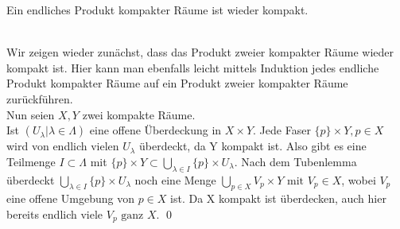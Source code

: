 \begin{Satz}\label{satz:prodkomp}
	Ein endliches Produkt kompakter Räume ist wieder kompakt.
\end{Satz}
	\\
	Wir zeigen wieder zunächst, dass das Produkt zweier kompakter Räume wieder kompakt ist. Hier kann man ebenfalls leicht mittels Induktion jedes endliche Produkt kompakter Räume 
	auf ein Produkt zweier kompakter Räume zurückführen. \\
	Nun seien \(X, Y\) zwei kompakte Räume.\\
	Ist \((U_{\lambda} | \lambda \in \Lambda) \) eine offene Überdeckung in \(X \times Y \). Jede Faser \( \{p\} \times Y, p \in X \) wird von endlich vielen \(U_{\lambda} \) überdeckt,
	da Y kompakt ist. Also gibt es eine Teilmenge \( I \subset \Lambda \) mit \( \{p\} \times Y \subset \bigcup_{ \lambda \in I } \{p\} \times U_{\lambda} \). 
	Nach dem Tubenlemma überdeckt \( \bigcup_{ \lambda \in I } \{p\} \times U_{\lambda} \) noch eine Menge \(\bigcup_{ p \in X } V_{p} \times Y \mbox{ mit } V_{p} \in X \),
	 wobei \( V_{p} \) eine offene Umgebung von \( p \in X \) ist. Da X kompakt ist überdecken, auch hier bereits endlich viele \(V_{p} \mbox{ ganz } X \). 
\qed

